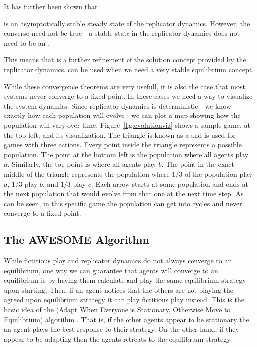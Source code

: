 It has further been shown that

\begin{theorem}
   is an asymptotically stable steady state of the
  replicator dynamics. However, the converse need not be true---a
  stable state in the replicator dynamics does not need to be an
   \cite{taylor78a}.
\end{theorem}  

This means that  is a further refinement of the solution
concept provided by the replicator dynamics.  can be used
when we need a very stable equilibrium concept.

\medskip

While these convergence theorems are very usefull, it is also the case
that most systems never converge to a fixed point. In these cases we
need a way to visualize the system dynamics. Since replicator dynamics
is deterministic---we know exactly how each population will
evolve---we can plot a map showing how the population will vary over
time. Figure~\ref{fig:evolutionviz} shows a sample game, at the top
left, and its visualization. The triangle is known as a  and is used for games with three actions. Every point inside
the triangle represents a possible population. The point at the bottom
left is the population where all agents play $a$. Similarly, the top
point is where all agents play $b$. The point in the exact middle of
the triangle represents the population where $1/3$ of the population
play $a$, $1/3$ play $b$, and $1/3$ play $c$. Each arrow starts at
some population and ends at the next population that would evolve from
that one at the next time step. As can be seen, in this specific game
the population can get into cycles and never converge to a fixed
point.

\subsection{The AWESOME Algorithm}
\label{sec:awesome-algorithm}

While fictitious play and replicator dynamics do not always converge
to an equilibrium, one way we can guarantee that agents will converge
to an equilibrium is by having them calculate and play the same
equilibrium strategy upon starting.  Then, if an agent notices that
the others are not playing the agreed upon equilibrium strategy it can
play fictitious play instead. This is the basic idea of the
 (Adapt When Everyone is Stationary, Otherwise Move to
Equilibrium) algorithm \cite{conitzer03a,conitzer06a}. That is, if the
other agents appear to be stationary the an  agent plays
the best response to their strategy. On the other hand, if they appear
to be adapting then the agents retreats to the equilibrium strategy.

